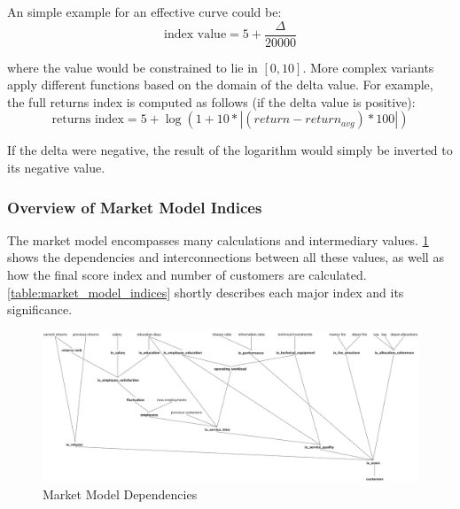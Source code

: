 An simple example for an effective curve could be:
\[\text{index value} = 5 + \frac{\Delta}{20000}\]

where the value would be constrained to lie in \([0, 10]\). More complex variants apply different functions based on the domain of the delta value. For example, the full returns index is computed as follows (if the delta value is positive):
\[\text{returns index} = 5 + \log(1 + 10 * |(return - return_{avg}) * 100|)\]

If the delta were negative, the result of the logarithm would simply be inverted to its negative value.

\subsubsection{Overview of Market Model Indices}
The market model encompasses many calculations and intermediary values. \ref{fig:market_model_dependencies} shows the dependencies and interconnections between all these values, as well as how the final score index and number of customers are calculated. \ref{table:market_model_indices} shortly describes each major index and its significance.

\begin{figure}[h!]
  \includegraphics[width=\textwidth]{img/market_model_dependencies.png}
  \caption{Market Model Dependencies}
  \centering
  \label{fig:market_model_dependencies}
\end{figure}

